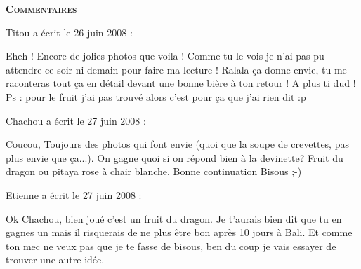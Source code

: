 \bigskip
\textbf{\textsc{Commentaires}}

\medskip
Titou a écrit le 26 juin 2008 :
\begin{displayquote}
Eheh ! Encore de jolies photos que voila ! Comme tu le vois je n'ai pas pu attendre ce soir ni demain pour faire ma lecture !
Ralala ça donne envie, tu me raconteras tout ça en détail devant une bonne bière à ton retour !
A plus ti dud !
Ps : pour le fruit j'ai pas trouvé alors c'est pour ça que j'ai rien dit :p
\end{displayquote}

\medskip
Chachou a écrit le 27 juin 2008 :
\begin{displayquote}
Coucou,
Toujours des photos qui font envie (quoi que la soupe de crevettes, pas plus envie que ça...).
On gagne quoi si on répond bien à la devinette?
Fruit du dragon ou pitaya rose à chair blanche.
Bonne continuation
Bisous ;-)
\end{displayquote}

\medskip
Etienne a écrit le 27 juin 2008 :
\begin{displayquote}
Ok Chachou, bien joué c'est un fruit du dragon. Je t'aurais bien dit que tu en gagnes un mais il risquerais de ne plus être bon après 10 jours à Bali. Et comme ton mec ne veux pas que je te fasse de bisous, ben du coup je vais essayer de trouver une autre idée.
\end{displayquote}

\vfill
